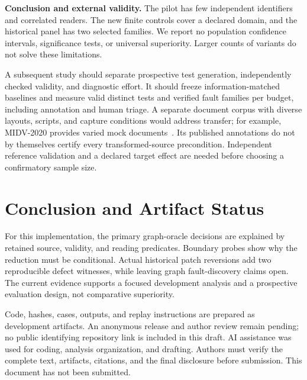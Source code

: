 \documentclass[sigconf,review,anonymous]{acmart}
\begin{document}
\textbf{Conclusion and external validity.} The pilot has few independent identifiers and correlated readers. The new finite controls cover a declared domain, and the historical panel has two selected families. We report no population confidence intervals, significance tests, or universal superiority. Larger counts of variants do not solve these limitations.

A subsequent study should separate prospective test generation, independently checked validity, and diagnostic effort. It should freeze information-matched baselines and measure valid distinct tests and verified fault families per budget, including annotation and human triage. A separate document corpus with diverse layouts, scripts, and capture conditions would address transfer; for example, MIDV-2020 provides varied mock documents~\cite{bulatov2022midv}. Its published annotations do not by themselves certify every transformed-source precondition. Independent reference validation and a declared target effect are needed before choosing a confirmatory sample size.

\section{Conclusion and Artifact Status}
For this implementation, the primary graph-oracle decisions are explained by retained source, validity, and reading predicates. Boundary probes show why the reduction must be conditional. Actual historical patch reversions add two reproducible defect witnesses, while leaving graph fault-discovery claims open. The current evidence supports a focused development analysis and a prospective evaluation design, not comparative superiority.

Code, hashes, cases, outputs, and replay instructions are prepared as development artifacts. An anonymous release and author review remain pending; no public identifying repository link is included in this draft. AI assistance was used for coding, analysis organization, and drafting. Authors must verify the complete text, artifacts, citations, and the final disclosure before submission. This document has not been submitted.



\end{document}
